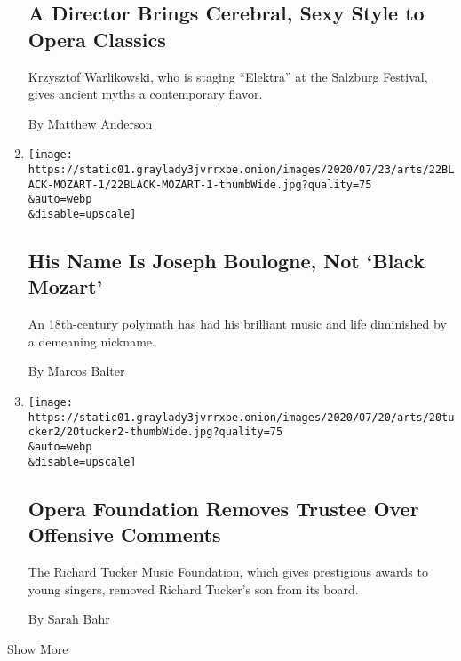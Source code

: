 \begin{enumerate}
  \hypertarget{a-director-brings-cerebral-sexy-style-to-opera-classics}{%
  \subsection{A Director Brings Cerebral, Sexy Style to Opera
  Classics}\label{a-director-brings-cerebral-sexy-style-to-opera-classics}}

  Krzysztof Warlikowski, who is staging ``Elektra'' at the Salzburg
  Festival, gives ancient myths a contemporary flavor.

  By Matthew Anderson
\item
  \href{/2020/07/22/arts/music/black-mozart-joseph-boulogne.html}{}

  \texttt{[image: https://static01.graylady3jvrrxbe.onion/images/2020/07/23/arts/22BLACK-MOZART-1/22BLACK-MOZART-1-thumbWide.jpg?quality=75\\\&auto=webp\\\&disable=upscale]}

  \hypertarget{his-name-is-joseph-boulogne-not-black-mozart}{%
  \subsection{His Name Is Joseph Boulogne, Not `Black
  Mozart'}\label{his-name-is-joseph-boulogne-not-black-mozart}}

  An 18th-century polymath has had his brilliant music and life
  diminished by a demeaning nickname.

  By Marcos Balter
\item
  \href{/2020/07/20/arts/music/tucker-foundation-opera-black.html}{}

  \texttt{[image: https://static01.graylady3jvrrxbe.onion/images/2020/07/20/arts/20tucker2/20tucker2-thumbWide.jpg?quality=75\\\&auto=webp\\\&disable=upscale]}

  \hypertarget{opera-foundation-removes-trustee-over-offensive-comments}{%
  \subsection{Opera Foundation Removes Trustee Over Offensive
  Comments}\label{opera-foundation-removes-trustee-over-offensive-comments}}

  The Richard Tucker Music Foundation, which gives prestigious awards to
  young singers, removed Richard Tucker's son from its board.

  By Sarah Bahr
\end{enumerate}

Show More

